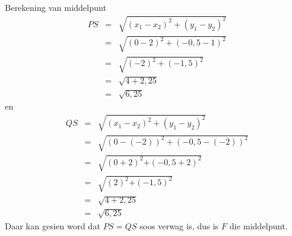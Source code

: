 \begin{wex}{Berekening van middelpunt}
{\begin{eqnarray*}
PS & = & \sqrt{{({x}_{1} - {x}_{2})}^{2} + {({y}_{1} - {y}_{2})}^{2}} \\ 
& = & \sqrt{{(0 - 2)}^{2} + {(-0,5 - 1)}^{2}} \\ 
& = & \sqrt{{(-2)}^{2} + {(-1,5)}^{2}} \\ 
& = & \sqrt{4 + 2,25} \\ 
& = & \sqrt{6,25}
\end{eqnarray*}
en
\begin{eqnarray*}
QS & = & \sqrt{{({x}_{1} - {x}_{2})}^{2} + {({y}_{1} - {y}_{2})}^{2}} \\ 
& = & \sqrt{{(0 - (-2))}^{2} + {(-0,5 - (-2))}^{2}} \\ 
& = & \sqrt{{(0 + 2)}^{2}{+(-0,5 + 2)}^{2}} \\ 
& = & \sqrt{{(2)}^{2}{+(-1,5)}^{2}} \\ 
& = & \sqrt{4 + 2,25} \\ 
& = & \sqrt{6,25}
\end{eqnarray*}
Daar kan gesien word dat $PS=QS$ soos verwag is, dus is $F$ die middelpunt. 
}
\end{wex}

